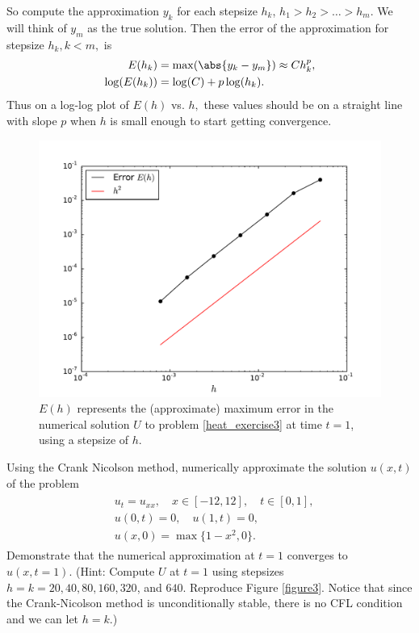 So compute the approximation $y_k$ for each stepsize $h_k$, $h_1 > h_2> \ldots>h_m.$  We will think of $y_m$ as the true solution.  Then the error of the approximation for 
stepsize $h_k, k < m,$ is 
\begin{align*}
	E(h_k) &= \max( \abs{ y_k - y_m}) \approx C h_k^p ,\\
	\log(E(h_k)) &= \log(C) + p \log(h_k).
\end{align*}
Thus on a log-log plot of $E(h)$ vs. $h,$ these values should be on a straight line with slope $p$ when $h$ is small enough to start getting convergence.

\begin{figure}[ht]
\centering
\includegraphics[width=12cm]{MaximumError.pdf}
\caption{$E(h)$ represents the (approximate) maximum error in the numerical solution $U$ to problem \eqref{heat_exercise3} at time $t=1$, using a stepsize of $h$.}
\label{figure3}
\end{figure}



\begin{problem}
	Using the Crank Nicolson method, numerically approximate the solution $u(x,t)$ of the problem 
	\begin{align}
		\begin{split}
		&{ } u_t = u_{xx}, \quad x \in [-12,12],\quad t \in [0,1], \\
		&{ } u(0,t) = 0,\quad u(1,t) = 0,\\
		&{ } u(x,0) = \max\{1 - x^2,0\}.
		\end{split}\label{heat_exercise3}
	\end{align}
	Demonstrate that the numerical approximation at $t = 1$ converges to  $u(x,t=1)$. (Hint: Compute $U$ at $t=1$ using stepsizes $h=k=20,40,80,160,320$, and $640$.  Reproduce Figure \eqref{figure3}.  Notice that since the Crank-Nicolson method is unconditionally stable, there is no CFL condition and we can let $h=k$.)
\end{problem}

